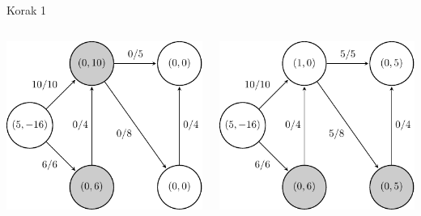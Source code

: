 \documentclass{beamer}
\begin{document}
\begin{frame}{Korak 1}
    \begin{columns}
        \begin{column}{0.5\textwidth}
            \centering
            \includegraphics[scale=0.7]{../writing/images/graf2-2.pdf}
        \end{column}
        \pause
        \begin{column}{0.5\textwidth}
            \centering
            \includegraphics[scale=0.7]{../writing/images/graf2-3.pdf}
        \end{column}
    \end{columns}
\end{frame}
\end{document}
